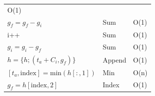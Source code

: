 \documentclass[
  12pt,
  a4paperpaper,
]{report}
\begin{document}
\begin{longtable}[]{@{}lll@{}}
\begin{minipage}[t]{0.15\columnwidth}
O(1)\strut
\end{minipage}\tabularnewline
\begin{minipage}[t]{0.52\columnwidth}\raggedright
\(g_f = g_f - g_i\)\strut
\end{minipage} & \begin{minipage}[t]{0.24\columnwidth}\raggedright
Sum\strut
\end{minipage} & \begin{minipage}[t]{0.15\columnwidth}\raggedright
O(1)\strut
\end{minipage}\tabularnewline
\begin{minipage}[t]{0.52\columnwidth}\raggedright
i++\strut
\end{minipage} & \begin{minipage}[t]{0.24\columnwidth}\raggedright
Sum\strut
\end{minipage} & \begin{minipage}[t]{0.15\columnwidth}\raggedright
O(1)\strut
\end{minipage}\tabularnewline
\begin{minipage}[t]{0.52\columnwidth}\raggedright
\(g_i = g_i - g_f\)\strut
\end{minipage} & \begin{minipage}[t]{0.24\columnwidth}\raggedright
Sum\strut
\end{minipage} & \begin{minipage}[t]{0.15\columnwidth}\raggedright
O(1)\strut
\end{minipage}\tabularnewline
\begin{minipage}[t]{0.52\columnwidth}\raggedright
\(h = \{ h; (t_a+C_i, g_f) \}\)\strut
\end{minipage} & \begin{minipage}[t]{0.24\columnwidth}\raggedright
Append\strut
\end{minipage} & \begin{minipage}[t]{0.15\columnwidth}\raggedright
O(1)\strut
\end{minipage}\tabularnewline
\begin{minipage}[t]{0.52\columnwidth}\raggedright
\([ t_a, \mathrm{index}] = \mathrm{min}( h[:,1] )\)\strut
\end{minipage} & \begin{minipage}[t]{0.24\columnwidth}\raggedright
Min\strut
\end{minipage} & \begin{minipage}[t]{0.15\columnwidth}\raggedright
O(n)\strut
\end{minipage}\tabularnewline
\begin{minipage}[t]{0.52\columnwidth}\raggedright
\(g_f = h[ \mathrm{index}, 2]\)\strut
\end{minipage} & \begin{minipage}[t]{0.24\columnwidth}\raggedright
Index\strut
\end{minipage} & \begin{minipage}[t]{0.15\columnwidth}\raggedright
O(1)\strut
\end{minipage}\tabularnewline
\bottomrule
\end{longtable}
\end{document}

